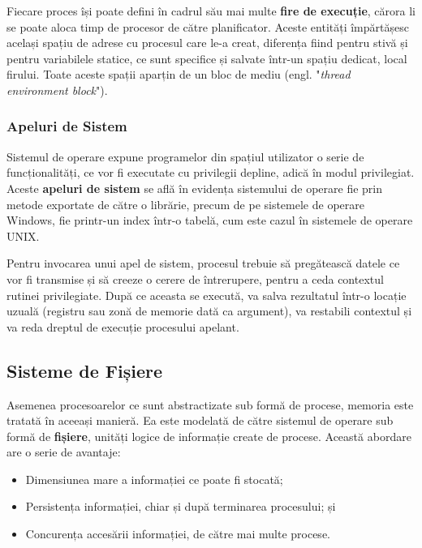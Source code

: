 \documentclass[../../main.tex]{subfiles}
\begin{document}

Fiecare proces își poate defini în cadrul său mai multe \textbf{fire de execuție}, cărora li se poate aloca timp de procesor de către planificator. Aceste entități împărtășesc același spațiu de adrese cu procesul care le-a creat, diferența fiind pentru stivă și pentru variabilele statice, ce sunt specifice și salvate într-un spațiu dedicat, local firului. Toate aceste spații aparțin de un bloc de mediu (engl. "\textit{thread environment block}").

\subsubsection{Apeluri de Sistem}

Sistemul de operare expune programelor din spațiul utilizator o serie de funcțio\-nalități, ce vor fi executate cu privilegii depline, adică în modul privilegiat. Aceste \textbf{apeluri de sistem} se află în evidența sistemului de operare fie prin metode exportate de către o librărie, precum  de pe sistemele de operare Windows, fie printr-un index într-o tabelă, cum este cazul în sistemele de operare UNIX.

Pentru invocarea unui apel de sistem, procesul trebuie să pregătească datele ce vor fi transmise și să creeze o cerere de întrerupere, pentru a ceda contextul rutinei privilegiate. După ce aceasta se execută, va salva rezultatul într-o locație uzuală (registru sau zonă de memorie dată ca argument), va restabili contextul și va reda dreptul de execuție procesului apelant.

\newpage

\subsection{Sisteme de Fișiere}

Asemenea procesoarelor ce sunt abstractizate sub formă de procese, memoria este tratată în aceeași manieră. Ea este modelată de către sistemul de operare sub formă de \textbf{fișiere}, unități logice de informație create de procese. Această abordare are o serie de avantaje:
\begin{itemize}
    \item Dimensiunea mare a informației ce poate fi stocată;
    \item Persistența informației, chiar și după terminarea procesului; și
    \item Concurența accesării informației, de către mai multe procese.
\end{itemize}
\end{document}
